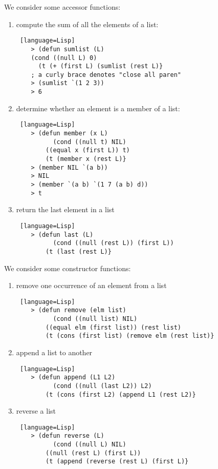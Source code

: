 \documentclass[../../lecture_notes.tex]{subfiles}
\begin{document}
\noindent We consider some accessor functions:
\begin{enumerate}
\item compute the sum of all the elements of a list:
\begin{lstlisting} [language=Lisp]
	> (defun sumlist (L)
	(cond ((null L) 0)
	  (t (+ (first L) (sumlist (rest L)}
	; a curly brace denotes "close all paren"
	> (sumlist `(1 2 3))
	> 6
\end{lstlisting}
\item determine whether an element is a member of a list:
\begin{lstlisting} [language=Lisp]
	> (defun member (x L)
	      (cond ((null t) NIL)
		((equal x (first L)) t)
		(t (member x (rest L)}
	> (member NIL `(a b))
	> NIL
	> (member `(a b) `(1 7 (a b) d))
	> t
\end{lstlisting}
\item return the last element in a list
\begin{lstlisting} [language=Lisp]
	> (defun last (L)
	      (cond ((null (rest L)) (first L))
		(t (last (rest L)}
\end{lstlisting} \medskip
\end{enumerate} 

\noindent We consider some constructor functions:
\begin{enumerate}
\item remove one occurrence of an element from a list 
\begin{lstlisting} [language=Lisp]
	> (defun remove (elm list)
	      (cond ((null list) NIL)
		((equal elm (first list)) (rest list)
		(t (cons (first list) (remove elm (rest list)}
\end{lstlisting}
\item append a list to another
\begin{lstlisting} [language=Lisp]
	> (defun append (L1 L2)
	      (cond ((null (last L2)) L2)
		(t (cons (first L2) (append L1 (rest L2)}
\end{lstlisting}
\item reverse a list
\begin{lstlisting} [language=Lisp]
	> (defun reverse (L)
	      (cond ((null L) NIL)
		((null (rest L) (first L))
		(t (append (reverse (rest L) (first L)}
\end{lstlisting}
\end{enumerate}
\end{document}
